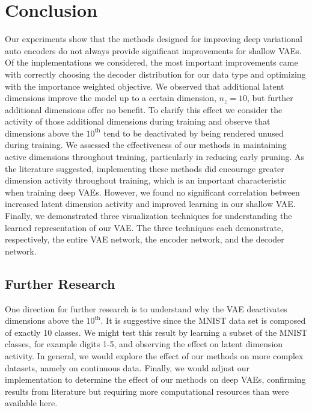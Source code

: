 \documentclass{article} %
\numberwithin{figure}{section}
\begin{document}
\section{Conclusion}
Our experiments show that the methods designed for improving deep variational auto encoders do not always provide significant improvements for shallow VAEs. Of the implementations we considered, the most important improvements came with correctly choosing the decoder distribution for our data type and optimizing with the importance weighted objective. We observed that additional latent dimensions improve the model up to a certain dimension, $n_z=10$, but further additional dimensions offer no benefit. To clarify this effect we consider the activity of those additional dimensions during training and observe that dimensions above the $10^{\text{th}}$ tend to be deactivated by being rendered unused during training. We assessed the effectiveness of our methods in maintaining active dimensions throughout training, particularly in reducing early pruning. As the literature suggested, implementing these methods did encourage greater dimension activity throughout training, which is an important characteristic when training deep VAEs. However, we found no significant correlation between increased latent dimension activity and improved learning in our shallow VAE. Finally, we demonstrated three visualization techniques for understanding the learned representation of our VAE. The three techniques each demonstrate, respectively, the entire VAE network, the encoder network, and the decoder network. 
\subsection{Further Research}
One direction for further research is to understand why the VAE deactivates dimensions above the $10^{\text{th}}$. It is suggestive since the MNIST data set is composed of exactly 10 classes. We might test this result by learning a subset of the MNIST classes, for example digits 1-5, and observing the effect on latent dimension activity. In general, we would explore the effect of our methods on more complex datasets, namely on continuous data. Finally, we would adjust our implementation to determine the effect of our methods on deep VAEs, confirming results from literature but  requiring more computational resources than were available here.



\end{document}
